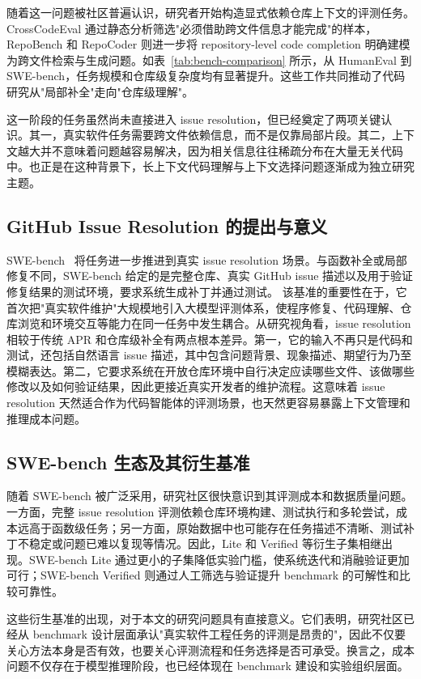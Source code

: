 随着这一问题被社区普遍认识，研究者开始构造显式依赖仓库上下文的评测任务。CrossCodeEval 通过静态分析筛选"必须借助跨文件信息才能完成"的样本，RepoBench 和 RepoCoder 则进一步将 repository-level code completion 明确建模为跨文件检索与生成问题。如表~\ref{tab:bench-comparison} 所示，从 HumanEval 到 SWE-bench，任务规模和仓库级复杂度均有显著提升。这些工作共同推动了代码研究从"局部补全"走向"仓库级理解"。

这一阶段的任务虽然尚未直接进入 issue resolution，但已经奠定了两项关键认识。其一，真实软件任务需要跨文件依赖信息，而不是仅靠局部片段。其二，上下文越大并不意味着问题越容易解决，因为相关信息往往稀疏分布在大量无关代码中。也正是在这种背景下，长上下文代码理解与上下文选择问题逐渐成为独立研究主题。

\subsection{GitHub Issue Resolution 的提出与意义}

SWE-bench~\cite{jimenez2023swebench} 将任务进一步推进到真实 issue resolution 场景。与函数补全或局部修复不同，SWE-bench 给定的是完整仓库、真实 GitHub issue 描述以及用于验证修复结果的测试环境，要求系统生成补丁并通过测试。
该基准的重要性在于，它首次把"真实软件维护"大规模地引入大模型评测体系，使程序修复、代码理解、仓库浏览和环境交互等能力在同一任务中发生耦合。从研究视角看，issue resolution 相较于传统 APR 和仓库级补全有两点根本差异。第一，它的输入不再只是代码和测试，还包括自然语言 issue 描述，其中包含问题背景、现象描述、期望行为乃至模糊表达。第二，它要求系统在开放仓库环境中自行决定应读哪些文件、该做哪些修改以及如何验证结果，因此更接近真实开发者的维护流程。这意味着 issue resolution 天然适合作为代码智能体的评测场景，也天然更容易暴露上下文管理和推理成本问题。

\subsection{SWE-bench 生态及其衍生基准}

随着 SWE-bench 被广泛采用，研究社区很快意识到其评测成本和数据质量问题。一方面，完整 issue resolution 评测依赖仓库环境构建、测试执行和多轮尝试，成本远高于函数级任务；另一方面，原始数据中也可能存在任务描述不清晰、测试补丁不稳定或问题已难以复现等情况。因此，Lite 和 Verified 等衍生子集相继出现。SWE-bench Lite 通过更小的子集降低实验门槛，使系统迭代和消融验证更加可行；SWE-bench Verified 则通过人工筛选与验证提升 benchmark 的可解性和比较可靠性。

这些衍生基准的出现，对于本文的研究问题具有直接意义。它们表明，研究社区已经从 benchmark 设计层面承认"真实软件工程任务的评测是昂贵的"，因此不仅要关心方法本身是否有效，也要关心评测流程和任务选择是否可承受。换言之，成本问题不仅存在于模型推理阶段，也已经体现在 benchmark 建设和实验组织层面。

